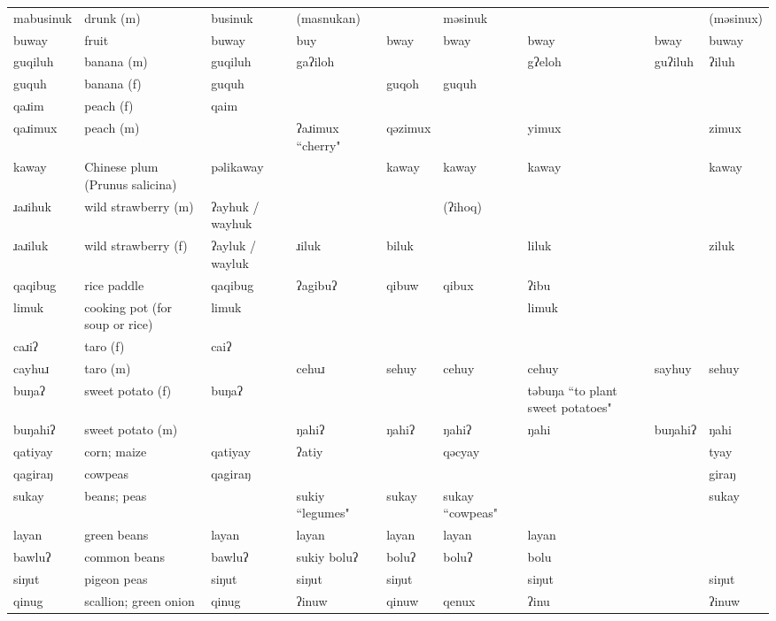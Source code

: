\begin{landscape}
\begin{longtable}{*{9}{p{}}}
\text{*}mabusinuk & drunk (m) & businuk & (masnukan) &  & məsinuk &  &  & (məsinux)\\
\text{*}buway & fruit & buway & buy & bway & bway & bway & bway & buway\\
\text{*}guqiluh & banana (m) & guqiluh & gaʔiloh &  &  & gʔeloh & guʔiluh & ʔiluh\\
\text{*}guquh & banana (f) & guquh &  & guqoh & guquh &  &  & \\
\text{*}qaɹim & peach (f) & qaim &  &  &  &  &  & \\
\text{*}qaɹimux & peach (m) &  & ʔaɹimux ``cherry" & qəzimux &  & yimux &  & zimux\\
\text{*}kaway & Chinese plum (Prunus salicina) & pəlikaway &  & kaway & kaway & kaway &  & kaway\\
\text{*}ɹaɹihuk & wild strawberry (m) & ʔayhuk / wayhuk &  &  & (ʔihoq) &  &  & \\
\text{*}ɹaɹiluk & wild strawberry (f) & ʔayluk / wayluk & ɹiluk & biluk &  & liluk &  & ziluk\\
\text{*}qaqibug & rice paddle & qaqibug & ʔagibuʔ & qibuw & qibux & ʔibu &  & \\
\text{*}limuk & cooking pot (for soup or rice) & limuk &  &  &  & limuk &  & \\
\text{*}caɹiʔ & taro (f) & caiʔ &  &  &  &  &  & \\
\text{*}cayhuɹ & taro (m) &  & cehuɹ & sehuy & cehuy & cehuy & sayhuy & sehuy\\
\text{*}buŋaʔ & sweet potato (f) & buŋaʔ &  &  &  & təbuŋa ``to plant sweet potatoes" &  & \\
\text{*}buŋahiʔ & sweet potato (m) &  & ŋahiʔ & ŋahiʔ & ŋahiʔ & ŋahi & buŋahiʔ & ŋahi\\
\text{*}qatiyay & corn; maize & qatiyay & ʔatiy &  & qəcyay &  &  & tyay\\
\text{*}qagiraŋ & cowpeas & qagiraŋ &  &  &  &  &  & giraŋ\\
\text{*}sukay & beans; peas &  & sukiy ``legumes" & sukay & sukay ``cowpeas" &  &  & sukay\\
\text{*}layan & green beans & layan & layan & layan & layan & layan &  & \\
\text{*}bawluʔ & common beans & bawluʔ & sukiy boluʔ & boluʔ & boluʔ & bolu &  & \\
\text{*}siŋut & pigeon peas & siŋut & siŋut & siŋut &  & siŋut &  & siŋut\\
\text{*}qinug & scallion; green onion & qinug & ʔinuw & qinuw & qenux & ʔinu &  & ʔinuw\\

\end{longtable}
\end{landscape}
